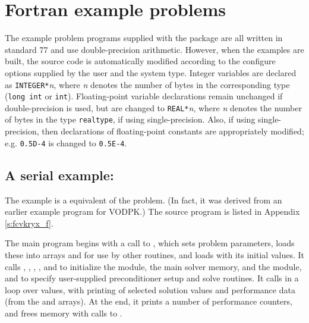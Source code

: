 \section{Fortran example problems}\label{s:ex_fortran}

The {\F} example problem programs supplied with the {\cvode}
package are all written in standard {\F}77 and use double-precision
arithmetic. However, when the {\F} examples are built, the source code is
automatically modified according to the configure options supplied by the
user and the system type. Integer variables are declared as {\tt INTEGER*}{\em n},
where {\em n} denotes the number of bytes in the corresponding {\C} type
({\tt long int} or {\tt int}). Floating-point variable declarations remain
unchanged if double-precision is used, but are changed to {\tt REAL*}{\em n},
where {\em n} denotes the number of bytes in the {\sundials} type {\tt realtype},
if using single-precision. Also, if using single-precision, then declarations of
floating-point constants are appropriately modified; e.g. {\tt 0.5D-4} is
changed to {\tt 0.5E-4}.


\subsection{A serial example: }\label{ss:fcvkryx}

The  example is a {\F} equivalent of the  problem.
(In fact, it was derived from an earlier {\F} example program for VODPK.)
The source program  is listed in Appendix \ref{s:fcvkryx_f}.

The main program begins with a call to , which sets problem
parameters, loads these into arrays  and  for use by other
routines, and loads  with its initial values.  It calls ,
, , , and  to
initialize the {\nvecs} module, the main solver memory, and the {\cvspgmr} module,
and to specify user-supplied preconditioner setup and solve routines.
It calls  in a loop over  values, with printing of
selected solution values and performance data (from the   and 
arrays).  At the end, it prints a number of performance counters, and
frees memory with calls to .

